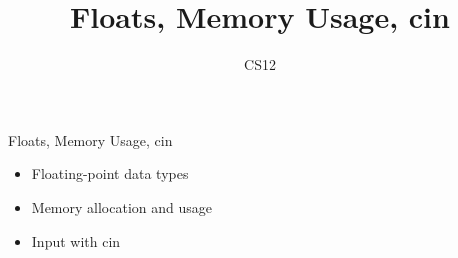 \documentclass{beamer}
\title{Floats, Memory Usage, cin}
\author{CS12}
\date{}
\begin{document}
\begin{frame}
    \titlepage
\end{frame}

\begin{frame}{Floats, Memory Usage, cin}
    \begin{itemize}
        \item Floating-point data types
        \item Memory allocation and usage
        \item Input with cin
    \end{itemize}
\end{frame}
\end{document}
